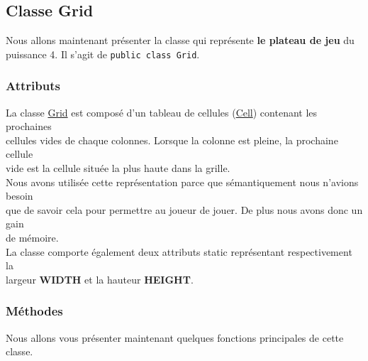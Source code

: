 \documentclass[11pt]{article}
\begin{document}
\subsection{Classe Grid\label{orgc79ccc3}}
\label{sec:org4466bae}

Nous allons maintenant présenter la classe qui représente \textbf{le plateau de jeu} du\\
puissance 4. Il s'agit de \texttt{public class Grid}.\\

\subsubsection{Attributs}
\label{sec:org0633223}

La classe \hyperref[orgc79ccc3]{Grid} est composé d'un tableau de cellules (\hyperref[org4b22c5b]{Cell}) contenant les prochaines\\
cellules vides de chaque colonnes. Lorsque la colonne est pleine, la prochaine cellule\\
vide est la cellule située la plus haute dans la grille.\\

Nous avons utilisée cette représentation parce que sémantiquement nous n'avions besoin\\
que de savoir cela pour permettre au joueur de jouer. De plus nous avons donc un gain\\
de mémoire.\\

La classe comporte également deux attributs static représentant respectivement la\\
largeur \textbf{WIDTH} et la hauteur \textbf{HEIGHT}.\\

\subsubsection{Méthodes}
\label{sec:orgbdb8426}

Nous allons vous présenter maintenant quelques fonctions principales de cette classe.\\
\end{document}
